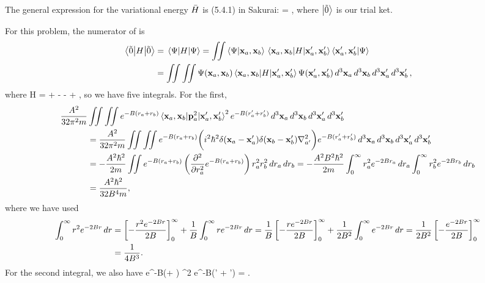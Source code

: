 \begin{solution}
	The general expression for the variational energy $\bar{H}$ is (5.4.1) in Sakurai:
	\beqn \label{Hbar}
		\Hbar = ,
	\eeqn
	where $\ket{\tilde{0}}$ is our trial ket.
	
	For this problem, the numerator of  is
	\begin{align*}
		\ev{H}{\ot} &= \ev{H}{\Psi}
		= \iint \braket{\Psi}{\vxa, \vxb} \mel{\vxa, \vxb}{H}{\vxa', \vxb'} \braket{\vxa', \vxb'}{\Psi} \\
		&= \iint \iint \Psi(\vxa, \vxb) \mel{\vxa, \vxb}{H}{\vxa', \vxb'} \Psi(\vxa', \vxb') \dcxa \dcxb \dcxap \dcxbp,
	\end{align*}
	where
	\beq
		H =  +  -  -  + ,
	\eeq
	so we have five integrals.  For the first,
	\begin{align*}
		\frac{A^2}{32 \pi^2 m} &\iint \iint e^{-B(\ra + \rb)} \mel{\vxa, \vxb}{\vpa^2}{\vxa', \vxb'}^2 e^{-B(\ra' + \rb')} \dcxa \dcxb \dcxap \dcxbp \\
		&= \frac{A^2}{32 \pi^2 m} \iint \iint e^{-B(\ra + \rb)} \bigg( i^2 \hbar^2 \delta(\vxa - \vxa') \delta(\vxb - \vxb') \laplacian_{a'} \bigg) e^{-B(\ra' + \rb')} \dcxa \dcxb \dcxap \dcxbp \\
		&= -\frac{A^2 \hbar^2}{2 m} \iint e^{-B(\ra + \rb)} \left( \pdv[2]{}{\ra} e^{-B(\ra + \rb)} \right) \ra^2 \rb^2 \dra \drb
		= -\frac{A^2 B^2 \hbar^2}{2 m} \intoi \ra^2 e^{-2 B \ra} \dra \intoi \rb^2 e^{-2 B \rb} \drb \\
		&= \frac{A^2 \hbar^2}{32 B^4 m},
	\end{align*}
	where we have used
	\begin{align*}
		\int_0^\infty r^2 e^{-2B r} \dd{r} &= \left[ -\frac{r^2 e^{-2 B r}}{2 B} \right]_0^\infty + \frac{1}{B} \int_0^\infty r e^{-2 B r} \dd{r}
		= \frac{1}{B} \left[ -\frac{r e^{-2 B r}}{2 B} \right]_0^\infty + \frac{1}{2 B^2} \int_0^\infty e^{-2 B r} \dd{r}
		= \frac{1}{2 B^2} \left[ -\frac{e^{-2 B r}}{2 B} \right]_0^\infty \\
		&= \frac{1}{4 B^3}.
	\end{align*}
	For the second integral, we also have
	\beq
		  \iint \iint e^{-B(\ra + \rb)} ^2 e^{-B(\ra' + \rb')} \dcxa \dcxb \dcxap \dcxbp = .
	\eeq
	

\end{solution}

